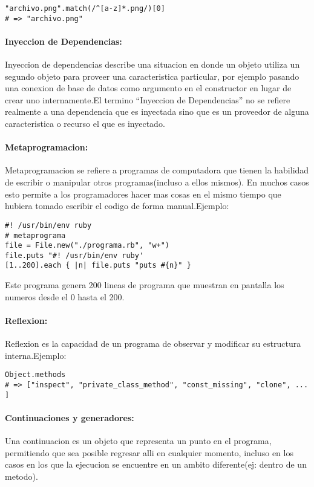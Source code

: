 \begin{verbatim}
"archivo.png".match(/^[a-z]*.png/)[0]
# => "archivo.png"
\end{verbatim}

\paragraph{Inyeccion de Dependencias:}
Inyeccion de dependencias describe una situacion en donde un objeto utiliza un segundo objeto para proveer una caracteristica particular, por ejemplo pasando una conexion de base de datos como argumento en el constructor en lugar de crear uno internamente.\newline El termino ``Inyeccion de Dependencias'' no se refiere realmente a una dependencia que es inyectada sino que es un proveedor de alguna caracteristica o recurso el que es inyectado.

\paragraph{Metaprogramacion:}
Metaprogramacion se refiere a programas de computadora que tienen la habilidad de escribir o manipular otros programas(incluso a ellos mismos). En muchos casos esto permite a los programadores hacer mas cosas en el mismo tiempo que hubiera tomado escribir el codigo de forma manual.\newline Ejemplo:

\begin{verbatim}
#! /usr/bin/env ruby
# metaprograma
file = File.new("./programa.rb", "w+")
file.puts "#! /usr/bin/env ruby'
[1..200].each { |n| file.puts "puts #{n}" }
\end{verbatim}

Este programa genera 200 lineas de programa que muestran en pantalla los numeros desde el 0 hasta el 200.

\paragraph{Reflexion:}
Reflexion es la capacidad de un programa de observar y modificar su estructura interna.\newline Ejemplo:

\begin{verbatim}
Object.methods
# => ["inspect", "private_class_method", "const_missing", "clone", ... ]
\end{verbatim}

\paragraph{Continuaciones y generadores:}
Una continuacion es un objeto que representa un punto en el programa, permitiendo que sea posible regresar alli en cualquier momento, incluso en los casos en los que la ejecucion se encuentre en un ambito diferente(ej: dentro de un metodo).


